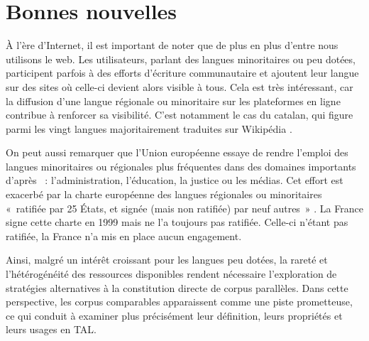 \newpage

\section{Bonnes nouvelles}

À l'ère d'Internet, il est important de noter que de plus en plus d'entre nous utilisons le web. Les
utilisateurs, parlant des langues minoritaires ou peu dotées, participent parfois à des efforts
d'écriture communautaire et ajoutent leur langue sur des sites où celle-ci devient alors visible à tous.
Cela est très intéressant, car la diffusion d’une langue régionale ou minoritaire sur les plateformes en
ligne contribue à renforcer sa visibilité. C’est notamment le cas du catalan, qui figure parmi les
vingt langues majoritairement traduites sur Wikipédia \citep{gerken_2022}.

On peut aussi remarquer que l'Union européenne essaye de rendre l'emploi des langues minoritaires ou
régionales plus fréquentes dans des domaines importants d'après \citet{gerken_2022}~: l'administration,
l'éducation, la justice ou les médias. Cet effort est exacerbé par la charte européenne des langues
régionales ou minoritaires «~ratifiée par 25 États, et signée (mais non ratifiée) par neuf autres~»
\citep{gerken_2022}. La France signe cette charte en 1999 mais ne l'a toujours pas ratifiée. Celle-ci n'étant
pas ratifiée, la France n'a mis en place aucun engagement.

\vspace{5mm}

Ainsi, malgré un intérêt croissant pour les langues peu dotées, la rareté et l’hétérogénéité des ressources disponibles
rendent nécessaire l’exploration de stratégies alternatives à la constitution directe de corpus parallèles.
Dans cette perspective, les corpus comparables apparaissent comme une piste prometteuse, ce qui conduit à examiner
plus précisément leur définition, leurs propriétés et leurs usages en TAL.
